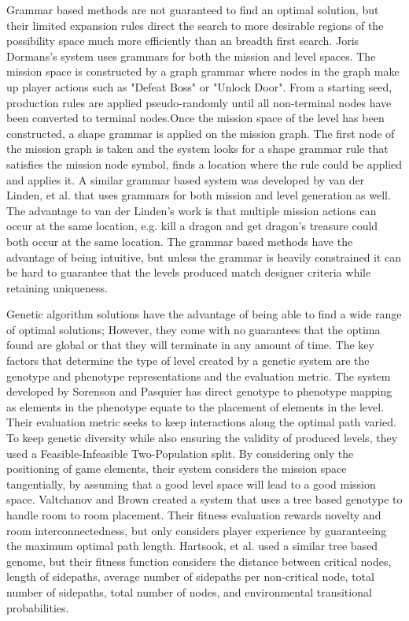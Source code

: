 \documentclass[12pt]{report}
\begin{document}
Grammar based methods are not guaranteed to find an optimal solution, but their limited expansion rules direct the search to more desirable regions of the possibility space much more efficiently than an breadth first search.  Joris Dormans's system \cite{JDADVENTURE} uses grammars for both the mission and level spaces.  The mission space is constructed 
by a graph grammar where nodes in the graph make up player actions such as "Defeat Boss" or "Unlock Door".  From a starting seed, production rules are applied pseudo-randomly until all non-terminal nodes have been converted to terminal nodes.Once the mission space of the level has been constructed, a shape grammar is applied on the mission graph.  The first node of the mission graph is taken and the system looks for a shape grammar rule that satisfies the mission node symbol, finds a location where the rule could be applied and applies it. A similar grammar based system was developed by van der Linden, et al. \cite{VDLPROCGENLEVEL}  that uses grammars for both mission and level generation as well.  The advantage to van der Linden's work is that multiple mission actions can occur at the same location, e.g. kill a dragon and get dragon's treasure could both occur at the same location.  The grammar based methods have the advantage of being intuitive, but unless the grammar is heavily constrained it can be hard to guarantee that the levels produced match designer criteria while retaining uniqueness.  

Genetic algorithm solutions have the advantage of being able to find a wide range of optimal solutions; However, they come with no guarantees that the optima found are global or that they will terminate in any amount of time.  The key factors that determine the type of level created by a genetic system are the genotype and phenotype representations and the evaluation metric. The system developed by Sorenson and Pasquier \cite{SORPASLEVEL} has direct genotype to phenotype mapping as elements in the phenotype equate to the placement of elements in the level. Their evaluation metric seeks to keep interactions along the optimal path varied.  To keep genetic diversity while also ensuring the validity of produced levels, they used a Feasible-Infeasible Two-Population split.  By considering only the positioning of game elements, their system considers the mission space tangentially, by assuming that a good level space will lead to a good mission space. Valtchanov and Brown \cite{VALTCHANOVEVOLVE} 
created a system that uses a tree based genotype to handle room to room placement.  Their fitness evaluation rewards novelty and room interconnectedness, but only considers player experience by guaranteeing the maximum optimal path length.  Hartsook, et al. \cite{hartsook} used a similar tree based genome, but their fitness function considers the distance between critical nodes, 
length of sidepaths, average number of sidepaths per non-critical node, total 
number of sidepaths, total number of nodes, and environmental transitional probabilities.  
\end{document}
